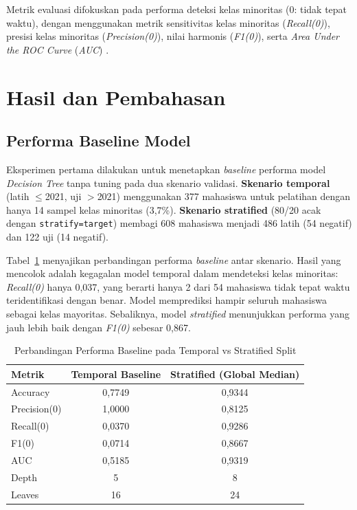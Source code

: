 \documentclass{ieeeaccess}
\begin{document}
Metrik evaluasi difokuskan pada performa deteksi kelas minoritas ($0$: tidak tepat waktu), dengan menggunakan metrik sensitivitas kelas minoritas (\emph{Recall(0)}), presisi kelas minoritas (\emph{Precision(0)}), nilai harmonis (\emph{F1(0)}), serta \emph{Area Under the ROC Curve} (\emph{AUC}) \cite{ref27}.

\section{Hasil dan Pembahasan}
\label{sec:results}

\subsection{Performa Baseline Model}
Eksperimen pertama dilakukan untuk menetapkan \emph{baseline} performa model \emph{Decision Tree} tanpa tuning pada dua skenario validasi. \textbf{Skenario temporal} (latih $\le$2021, uji $>$2021) menggunakan 377 mahasiswa untuk pelatihan dengan hanya 14 sampel kelas minoritas (3,7\%). \textbf{Skenario stratified} (80/20 acak dengan \texttt{stratify=target}) membagi 608 mahasiswa menjadi 486 latih (54 negatif) dan 122 uji (14 negatif).

Tabel~\ref{tab:baseline} menyajikan perbandingan performa \emph{baseline} antar skenario. Hasil yang mencolok adalah kegagalan model temporal dalam mendeteksi kelas minoritas: \emph{Recall(0)} hanya 0,037, yang berarti hanya 2 dari 54 mahasiswa tidak tepat waktu teridentifikasi dengan benar. Model memprediksi hampir seluruh mahasiswa sebagai kelas mayoritas. Sebaliknya, model \emph{stratified} menunjukkan performa yang jauh lebih baik dengan \emph{F1(0)} sebesar 0,867.

\begin{table}[t]
\caption{Perbandingan Performa Baseline pada Temporal vs Stratified Split}
\label{tab:baseline}
\begin{center}
\begin{tabular}{lcc}
\hline
\textbf{Metrik} & \textbf{Temporal Baseline} & \textbf{Stratified (Global Median)} \\
\hline
Accuracy       & 0,7749 & 0,9344 \\
Precision(0)   & 1,0000 & 0,8125 \\
Recall(0)      & 0,0370 & 0,9286 \\
F1(0)          & 0,0714 & 0,8667 \\
AUC            & 0,5185 & 0,9319 \\
Depth          & 5       & 8      \\
Leaves         & 16      & 24     \\
\hline
\end{tabular}
\end{center}
\end{table}
\end{document}
